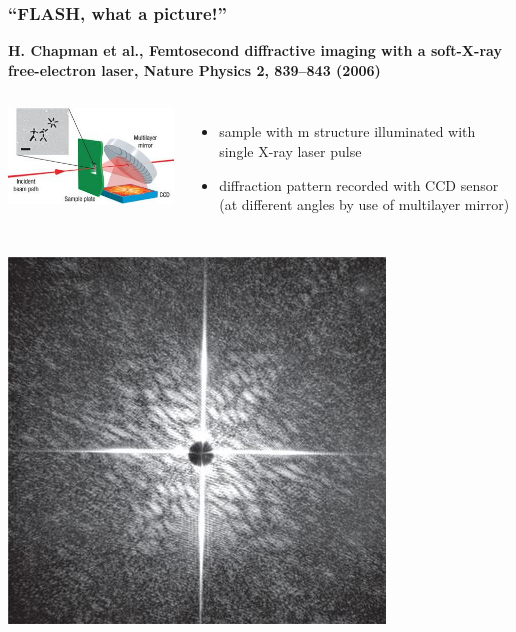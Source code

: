\documentclass[10pt,t]{beamer}
\begin{document}
\begin{frame}
\frametitle{``FLASH, what a picture!''}
\vspace*{-2.6\baselineskip}
\alert{\bfseries\footnotesize H. Chapman et al., Femtosecond diffractive imaging with a soft-X-ray free-electron laser, Nature Physics 2, 839--843 (2006)}
\vspace*{\baselineskip}
\begin{columns}[c]
\includegraphics[width=\textwidth]{flash-aufbau}
\begin{itemize}
    \item sample with \textmu m structure illuminated with single X-ray laser pulse
    \item diffraction pattern recorded with CCD sensor (at different angles by use of multilayer mirror)
\end{itemize}
\end{columns}
\vspace*{1ex}
\begin{columns}[c]
\includegraphics[width=\textwidth]{flash-beugungsbild}

\end{columns}
\end{frame}
\end{document}
